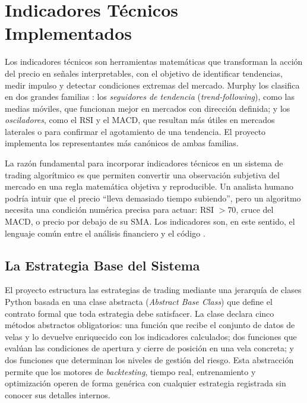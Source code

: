 \section{Indicadores Técnicos Implementados}
\label{sec:indicadores}

Los indicadores técnicos son herramientas matemáticas que transforman la acción del precio en señales interpretables, con el objetivo de identificar tendencias, medir impulso y detectar condiciones extremas del mercado. Murphy los clasifica en dos grandes familias \parencite{murphy_technical_1999}: los \textit{seguidores de tendencia} (\textit{trend-following}), como las medias móviles, que funcionan mejor en mercados con dirección definida; y los \textit{osciladores}, como el RSI y el MACD, que resultan más útiles en mercados laterales o para confirmar el agotamiento de una tendencia. El proyecto implementa los representantes más canónicos de ambas familias.

La razón fundamental para incorporar indicadores técnicos en un sistema de trading algorítmico es que permiten convertir una observación subjetiva del mercado en una regla matemática objetiva y reproducible. Un analista humano podría intuir que el precio ``lleva demasiado tiempo subiendo'', pero un algoritmo necesita una condición numérica precisa para actuar: RSI $> 70$, cruce del MACD, o precio por debajo de su SMA. Los indicadores son, en este sentido, el lenguaje común entre el análisis financiero y el código \parencite{chan_algorithmic_2013}.

\subsection{La Estrategia Base del Sistema}

El proyecto estructura las estrategias de trading mediante una jerarquía de clases Python basada en una clase abstracta (\textit{Abstract Base Class}) que define el contrato formal que toda estrategia debe satisfacer. La clase declara cinco métodos abstractos obligatorios: una función que recibe el conjunto de datos de velas y lo devuelve enriquecido con los indicadores calculados; dos funciones que evalúan las condiciones de apertura y cierre de posición en una vela concreta; y dos funciones que determinan los niveles de gestión del riesgo. Esta abstracción permite que los motores de \textit{backtesting}, tiempo real, entrenamiento y optimización operen de forma genérica con cualquier estrategia registrada sin conocer sus detalles internos.

